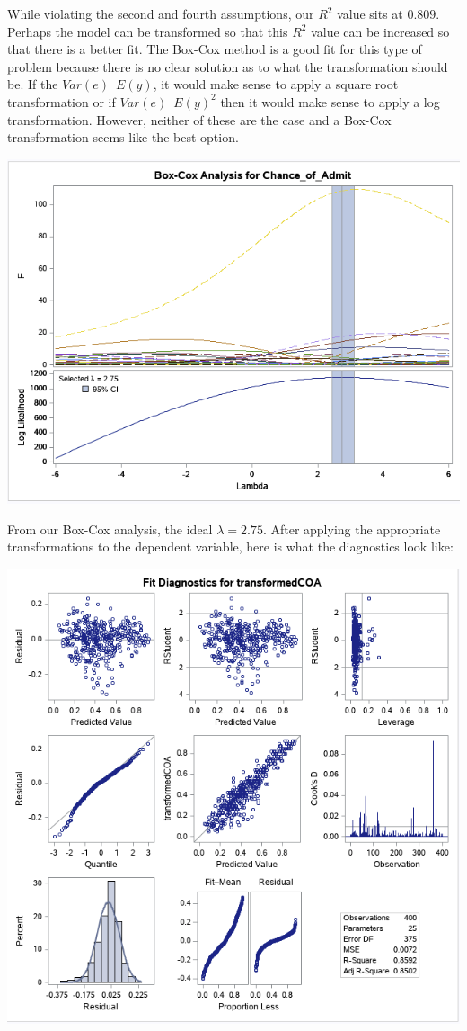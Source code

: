 \documentclass{article}
\begin{document}
While violating the second and fourth assumptions, our $R^2$ value sits at $0.809$. Perhaps the model can be transformed so that this $R^2$ value can be increased so that there is a better fit. The Box-Cox method is a good fit for this type of problem because there is no clear solution as to what the transformation should be. If the $Var(e)$~$E(y)$, it would make sense to apply a square root transformation or if $Var(e)$~$E(y)^2$ then it would make sense to apply a log transformation. However, neither of these are the case and a Box-Cox transformation seems like the best option.

\includegraphics[scale=0.5]{boxcox.png}

From our Box-Cox analysis, the ideal $\lambda = 2.75$. After applying the appropriate transformations to the dependent variable, here is what the diagnostics look like:

\includegraphics[scale=0.5]{transformedDiagnostics.png}
\end{document}
